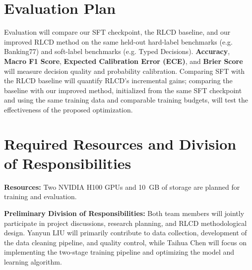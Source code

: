 \documentclass[10pt,a4paper]{article}
\begin{document}

\section*{Evaluation Plan}

Evaluation will compare our SFT checkpoint,
the RLCD baseline, and our improved RLCD method on
the same held-out hard-label benchmarks
(e.g. Banking77) and soft-label benchmarks
(e.g. Typed Decisions).
\textbf{Accuracy},
\textbf{Macro F1 Score},
\textbf{Expected Calibration Error (ECE)},
and \textbf{Brier Score}
will measure decision quality and probability calibration.
Comparing SFT with the RLCD baseline will quantify
RLCD's incremental gains; comparing the baseline
with our improved method, initialized from the same
SFT checkpoint and using the same training data and
comparable training budgets, will test the effectiveness
of the proposed optimization.


\section*{Required Resources and Division of Responsibilities}

\textbf{Resources:}
Two NVIDIA H100 GPUs and 10~GB of storage are planned
for training and evaluation.

\textbf{Preliminary Division of Responsibilities:}
Both team members will jointly participate in project
discussions, research planning, and RLCD methodological
design.
Yanyun LIU will primarily contribute to data collection,
development of the data cleaning pipeline, and quality control,
while Taihua Chen will focus on implementing the two-stage
training pipeline and optimizing the model and learning algorithm.
\end{document}

